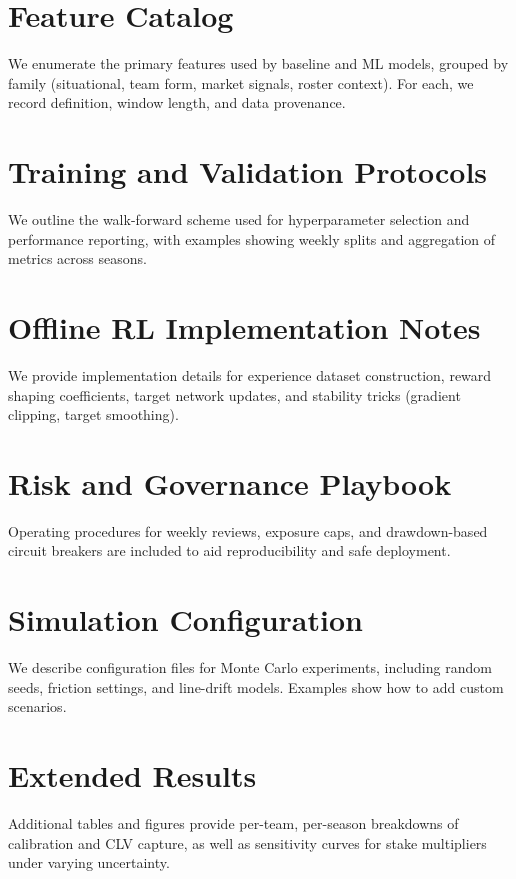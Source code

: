 \documentclass[12pt]{report}  %
\numberwithin{equation}{section}
\theoremstyle{plain}
\theoremstyle{definition}
\theoremstyle{remark}
\begin{document}
\section{Feature Catalog}
We enumerate the primary features used by baseline and ML models, grouped by family (situational, team form, market signals, roster context). For each, we record definition, window length, and data provenance.

\section{Training and Validation Protocols}
We outline the walk-forward scheme used for hyperparameter selection and performance reporting, with examples showing weekly splits and aggregation of metrics across seasons.

\section{Offline RL Implementation Notes}
We provide implementation details for experience dataset construction, reward shaping coefficients, target network updates, and stability tricks (gradient clipping, target smoothing).

\section{Risk and Governance Playbook}
Operating procedures for weekly reviews, exposure caps, and drawdown-based circuit breakers are included to aid reproducibility and safe deployment.

\section{Simulation Configuration}
We describe configuration files for Monte Carlo experiments, including random seeds, friction settings, and line-drift models. Examples show how to add custom scenarios.

\section{Extended Results}
Additional tables and figures provide per-team, per-season breakdowns of calibration and CLV capture, as well as sensitivity curves for stake multipliers under varying uncertainty.

\end{document}

